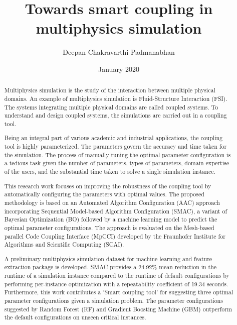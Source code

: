 \documentclass[rnd]{mas_report}
\author{Deepan Chakravarthi Padmanabhan}
\title{Towards smart coupling in multiphysics simulation}
\date{January 2020}
\begin{document}
\frontmatter
\begin{titlepage}
    \maketitle
\end{titlepage}


\pagestyle{plain}


\cleardoublepage
\statementpage

\begin{abstract}

Multiphysics simulation is the study of the interaction between multiple physical domains. An example of multiphysics simulation is Fluid-Structure Interaction (FSI). The systems integrating multiple physical domains are called coupled systems. To understand and design coupled systems, the simulations are carried out in a coupling tool.

Being an integral part of various academic and industrial applications, the coupling tool is highly parameterized. The parameters govern the accuracy and time taken for the simulation. The process of manually tuning the optimal parameter configuration is a tedious task given the number of parameters, types of parameters, domain expertise of the users, and the substantial time taken to solve a single simulation instance.

This research work focuses on improving the robustness of the coupling tool by automatically configuring the parameters with optimal values. The proposed methodology is based on an Automated Algorithm Configuration (AAC) approach incorporating Sequential Model-based Algorithm Configuration (SMAC), a variant of Bayesian Optimization (BO) followed by a machine learning model to predict the optimal parameter configurations. The approach is evaluated on the Mesh-based parallel Code Coupling Interface (MpCCI) developed by the Fraunhofer Institute for Algorithms and Scientific Computing (SCAI).

A preliminary multiphysics simulation dataset for machine learning and feature extraction package is developed. SMAC provides a 24.92\% mean reduction in the runtime of a simulation instance compared to the runtime of default configurations by performing per-instance optimization with a repeatability coefficient of 19.34 seconds. Furthermore, this work contributes a 'Smart coupling tool' for suggesting three optimal parameter configurations given a simulation problem. The parameter configurations suggested by Random Forest (RF) and Gradient Boosting Machine (GBM) outperform the default configurations on unseen critical instances. 

\end{abstract}
\end{document}
